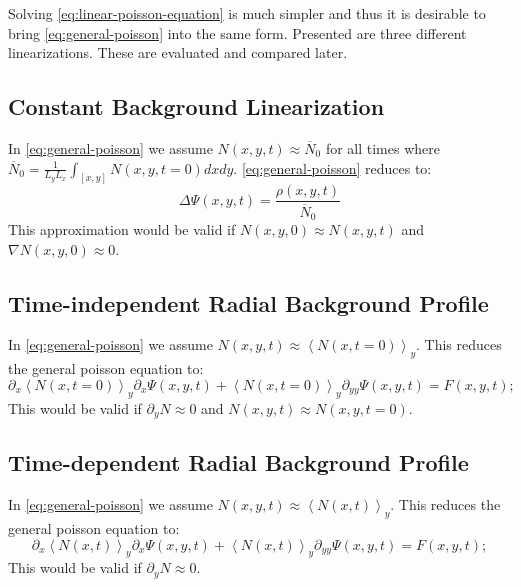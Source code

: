 Solving \autoref{eq:linear-poisson-equation} is much simpler and thus it is desirable to bring \autoref{eq:general-poisson} into the same form. Presented are three different linearizations. These are evaluated and compared later.

\subsection{Constant Background Linearization}

In \autoref{eq:general-poisson} we assume $N(x,y, t) \approx \overline{N}_0$ for all times where $\overline{N}_0=\frac{1}{L_yL_x}\int_{[x,y]} N(x,y, t = 0) dx dy$. \autoref{eq:general-poisson} reduces to:
\begin{equation}
    \Delta \Psi(x,y,t) = \frac{\rho(x,y,t)}{\overline{N}_0}
\end{equation}
This approximation would be valid if $N(x,y, 0) \approx N(x,y,t)$ and $\nabla N(x,y,0) \approx 0$.

\subsection{Time-independent Radial Background Profile}
In \autoref{eq:general-poisson} we assume $N(x,y,t) \approx \left<N(x,t = 0)\right>_y$. This reduces the general poisson equation to:
\begin{equation}
    \partial_x \left<N(x,t = 0)\right>_y \partial_x \Psi(x,y,t) + \left<N(x,t = 0)\right>_y \partial_{yy} \Psi(x,y,t) = F(x,y,t);
\end{equation}
This would be valid if $\partial_y N \approx 0$ and $N(x,y,t) \approx N(x,y, t= 0)$.

\subsection{Time-dependent Radial Background Profile}
In \autoref{eq:general-poisson} we assume $N(x,y,t) \approx \left<N(x,t)\right>_y$. This reduces the general poisson equation to:
\begin{equation}
    \partial_x \left<N(x,t)\right>_y \partial_x \Psi(x,y,t) + \left<N(x,t)\right>_y \partial_{yy} \Psi(x,y,t) = F(x,y,t);
\end{equation}
This would be valid if $\partial_y N \approx 0$.

